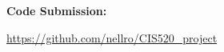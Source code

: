 \documentclass[twoside,11pt]{article}
\renewcommand{\>}{{\rightarrow}}
\newcommand{\1}{{\mathbf 1}}
\newcommand{\0}{{\mathbf 0}}
\begin{document}
\vspace{12pt}

\textbf{Code Submission:}

\url{https://github.com/nellro/CIS520_project}


\newpage
%











\newpage

 
\end{document}
